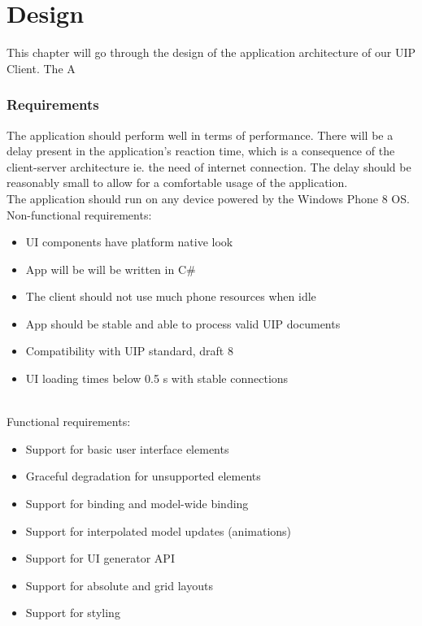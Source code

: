 \chapter{Design}
This chapter will go through the design of the application architecture of our UIP Client. The A



\subsection{Requirements}
The application should perform well in terms of performance. There will be a delay present in the application's reaction time, which is a consequence of the client-server architecture ie. the need of internet connection. The delay should be reasonably small to allow for a comfortable usage of the application.
\\
The application should run on any device powered by the Windows Phone 8 OS.
\newline
\\
Non-functional requirements:
\begin{itemize}
  \item UI components have platform native look
  \item App will be will be written in C\#
  \item The client should not use much phone resources when idle
  \item App should be stable and able to process valid UIP documents
  \item Compatibility with UIP standard, draft 8
  \item UI loading times below 0.5 s with stable connections
\end{itemize}
~\\
Functional requirements:
\begin{itemize}
  \item  Support for basic user interface elements
  \item Graceful degradation for unsupported elements
  \item  Support for binding and model-wide binding
  \item  Support for interpolated model updates (animations)
    \item  Support for UI generator API
  \item Support for absolute and grid layouts
    \item Support for styling
\end{itemize}

